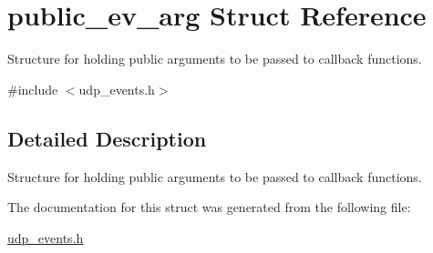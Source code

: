 \hypertarget{structpublic__ev__arg}{\section{public\-\_\-ev\-\_\-arg \-Struct \-Reference}
\label{structpublic__ev__arg}
}


\-Structure for holding public arguments to be passed to callback functions.  




{\ttfamily \#include $<$udp\-\_\-events.\-h$>$}



\subsection{\-Detailed \-Description}
\-Structure for holding public arguments to be passed to callback functions. 

\-The documentation for this struct was generated from the following file\-:\begin{DoxyCompactItemize}
\item 
\hyperlink{udp__events_8h}{udp\-\_\-events.\-h}\end{DoxyCompactItemize}
